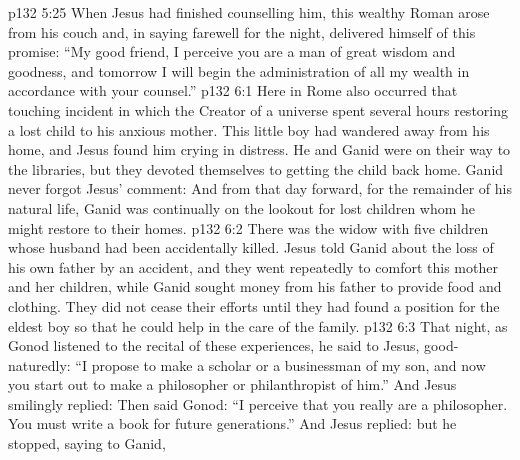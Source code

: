 \vs p132 5:25 \pc When Jesus had finished counselling him, this wealthy Roman arose from his couch and, in saying farewell for the night, delivered himself of this promise: “My good friend, I perceive you are a man of great wisdom and goodness, and tomorrow I will begin the administration of all my wealth in accordance with your counsel.”
\vs p132 6:1 Here in Rome also occurred that touching incident in which the Creator of a universe spent several hours restoring a lost child to his anxious mother. This little boy had wandered away from his home, and Jesus found him crying in distress. He and Ganid were on their way to the libraries, but they devoted themselves to getting the child back home. Ganid never forgot Jesus’ comment:  And from that day forward, for the remainder of his natural life, Ganid was continually on the lookout for lost children whom he might restore to their homes.
\vs p132 6:2 \pc There was the widow with five children whose husband had been accidentally killed. Jesus told Ganid about the loss of his own father by an accident, and they went repeatedly to comfort this mother and her children, while Ganid sought money from his father to provide food and clothing. They did not cease their efforts until they had found a position for the eldest boy so that he could help in the care of the family.
\vs p132 6:3 \pc That night, as Gonod listened to the recital of these experiences, he said to Jesus, good\hyp{}naturedly: “I propose to make a scholar or a businessman of my son, and now you start out to make a philosopher or philanthropist of him.” And Jesus smilingly replied:  Then said Gonod: “I perceive that you really are a philosopher. You must write a book for future generations.” And Jesus replied:  but he stopped, saying to Ganid, 

